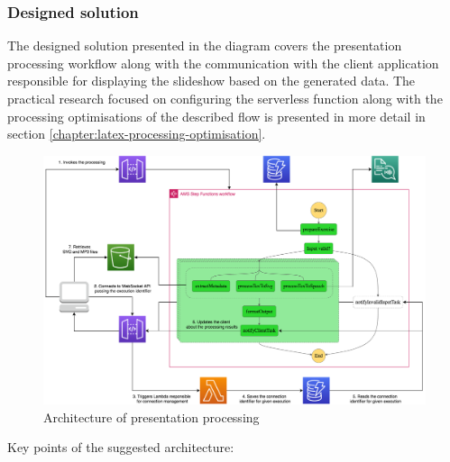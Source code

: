 \subsubsection{Designed solution}

The designed solution presented in the diagram covers the presentation processing workflow along with the communication with the client application responsible for displaying the slideshow based on the generated data. 
The practical research focused on configuring the serverless function along with the processing optimisations of the described flow is presented in more detail in section \ref{chapter:latex-processing-optimisation}.

\begin{figure}[H]
   \centering
   \includegraphics[width=1\textwidth]{assets/04-serverless-for-web-apps/euclidArchitecture.png}
   \caption{Architecture of presentation processing}
   \label{fig:euclid-web-app}
\end{figure}

Key points of the suggested architecture:

